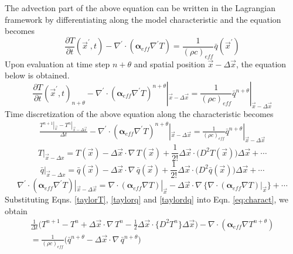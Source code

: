 The advection part of the above equation can be written in the Lagrangian framework by differentiating along the model characteristic and the equation becomes
\begin{equation}
\frac{\partial T}{\partial t}(\vec{x}^{\prime},t) -\nabla^{\prime}\cdot(\mathbf{\alpha}_{eff}\nabla^{\prime} T)=\frac{1}{(\rho c )_{eff}}\bar{q}(\vec{x}^{\prime})
\end{equation}
Upon evaluation at time step $n+\theta$ and spatial position $\vec{x}-\Delta\vec{x}$, the equation below is obtained.
\begin{equation}
\frac{\partial T}{\partial t}(\vec{x}^{\prime},t)_{n+\theta} -\nabla^{\prime}\cdot(\mathbf{\alpha}_{eff}\nabla^{\prime} T)^{n+\theta}|_{\vec{x}-\Delta\vec{x}}=\frac{1}{(\rho c )_{eff}}\bar{q}^{n+\theta}|_{\vec{x}-\Delta\vec{x}}
\end{equation}
Time discretization of the above equation along the characteristic becomes
\begin{equation}	\label{eq:charact}
\begin{split}
\frac{T^{n+1}|_{\vec{x}}-T^n|_{\vec{x}-\Delta \vec{x}}}{\Delta t}  -\nabla^{\prime}\cdot(\mathbf{\alpha}_{eff}\nabla^{\prime} T)^{n+\theta}|_{\vec{x}-\Delta\vec{x}}=\frac{1}{(\rho c )_{eff}}\bar{q}^{n+\theta}|_{\vec{x}-\Delta\vec{x}}
\end{split}
\end{equation}
%
\begin{equation}	\label{taylorT}
T|_{\vec{x}-\Delta x} = T(\vec{x})- \Delta \vec{x}\cdot  \nabla\,T(\vec{x})+\frac{1}{2!}\Delta\vec{x}\cdot\big(D^2T(\vec{x})\big)\Delta\vec{x}+\cdots
\end{equation}
%
\begin{equation}	\label{taylorq}
\bar{q}|_{\vec{x}-\Delta x} = \bar{q}(\vec{x})- \Delta \vec{x}\cdot  \nabla\,\bar{q}(\vec{x})+\frac{1}{2!}\Delta\vec{x}\cdot\big(D^2\bar{q}(\vec{x})\big)\Delta\vec{x}+\cdots
\end{equation}
%
\begin{equation}	\label{taylordq}
\nabla^{\prime}\cdot(\mathbf{\alpha}_{eff}\nabla^{\prime} T)|_{\vec{x}-\Delta\vec{x}} = \nabla\cdot(\mathbf{\alpha}_{eff}\nabla T)|_{\vec{x}}- \Delta \vec{x}\cdot  \nabla\,\{ \nabla\cdot(\mathbf{\alpha}_{eff}\nabla T)|_{\vec{x}}\}+\cdots
\end{equation}
%
Substituting Eqns. \ref{taylorT}, \ref{taylorq} and \ref{taylordq} into Eqn. \ref{eq:charact}, we obtain
\begin{equation}
\begin{split}
\frac{1}{\Delta t}\Big(T^{n+1}-T^n+\Delta \vec{x}\cdot  \nabla\,T^n-\frac{1}{2}\Delta\vec{x}\cdot\{D^2T^n\}\Delta\vec{x}\Big)	
-\nabla\cdot(\mathbf{\alpha}_{eff}\nabla T^{n+\theta}) \\
=\frac{1}{(\rho c )_{eff}}\big(\bar{q}^{n+\theta}- \Delta \vec{x}\cdot  \nabla\,\bar{q}^{n+\theta}\big)
\end{split}
\end{equation}
